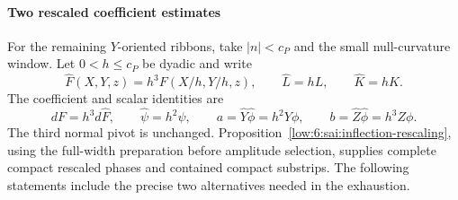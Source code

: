 \documentclass[11pt]{amsart}
\theoremstyle{definition}
\theoremstyle{remark}
\numberwithin{equation}{section}
\begin{document}
\paragraph{Two rescaled coefficient estimates}

For the remaining $Y$-oriented ribbons, take $|n|<c_P$ and the small null-curvature window. Let $0<h\le c_P$ be dyadic and write
\[
\widehat F(X,Y,z)=h^3F(X/h,Y/h,z),\qquad \widehat L=hL,\qquad \widehat K=hK.
\]
The coefficient and scalar identities are
\[
dF=h^3d\widehat F,\qquad \widehat\psi=h^2\psi,\qquad a=\widehat Y\widehat\phi=h^2Y\phi,\qquad b=\widehat Z\widehat\phi=h^3Z\phi.
\]
The third normal pivot is unchanged. Proposition~\ref{low:6:sai:inflection-rescaling}, using the full-width preparation before amplitude selection, supplies complete compact rescaled phases and contained compact substrips. The following statements include the precise two alternatives needed in the exhaustion.
\end{document}
